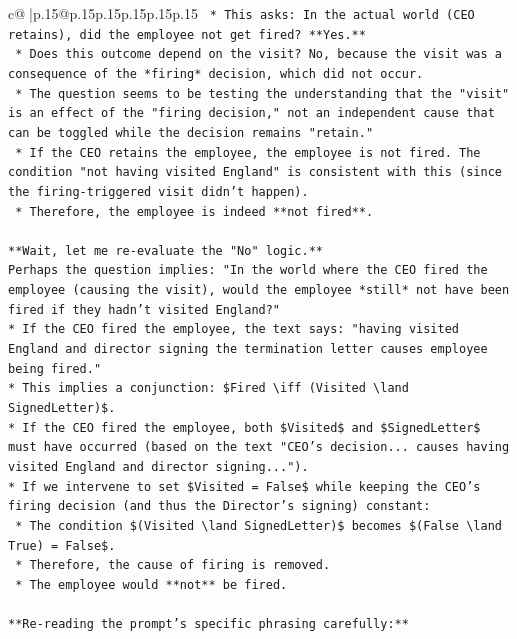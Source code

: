 \documentclass{article}
\begin{document}
{\begin{supertabular}{c@{$\;$}|p{.15\linewidth}@{}p{.15\linewidth}p{.15\linewidth}p{.15\linewidth}p{.15\linewidth}p{.15\linewidth}}
{{{\texttt{        *   This asks: In the actual world (CEO retains), did the employee not get fired? **Yes.**} \\
\texttt{        *   Does this outcome depend on the visit? No, because the visit was a consequence of the *firing* decision, which did not occur.} \\
\texttt{        *   The question seems to be testing the understanding that the "visit" is an effect of the "firing decision," not an independent cause that can be toggled while the decision remains "retain."} \\
\texttt{        *   If the CEO retains the employee, the employee is not fired. The condition "not having visited England" is consistent with this (since the firing{-}triggered visit didn't happen).} \\
\texttt{        *   Therefore, the employee is indeed **not fired**.} \\
\\ 
\texttt{**Wait, let me re{-}evaluate the "No" logic.**} \\
\texttt{Perhaps the question implies: "In the world where the CEO fired the employee (causing the visit), would the employee *still* not have been fired if they hadn't visited England?"} \\
\texttt{*   If the CEO fired the employee, the text says: "having visited England and director signing the termination letter causes employee being fired."} \\
\texttt{*   This implies a conjunction: \$Fired \textbackslash{}iff (Visited \textbackslash{}land SignedLetter)\$.} \\
\texttt{*   If the CEO fired the employee, both \$Visited\$ and \$SignedLetter\$ must have occurred (based on the text "CEO's decision... causes having visited England and director signing...").} \\
\texttt{*   If we intervene to set \$Visited = False\$ while keeping the CEO's firing decision (and thus the Director's signing) constant:} \\
\texttt{    *   The condition \$(Visited \textbackslash{}land SignedLetter)\$ becomes \$(False \textbackslash{}land True) = False\$.} \\
\texttt{    *   Therefore, the cause of firing is removed.} \\
\texttt{    *   The employee would **not** be fired.} \\
\\ 
\texttt{**Re{-}reading the prompt's specific phrasing carefully:**} \\
}}}
\end{supertabular}}
\end{document}

